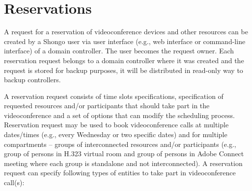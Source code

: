 \chapter{Reservations}

A request for a reservation of videoconference devices and other resources can be created by a Shongo user via user interface (e.g., web interface or command-line interface) of a domain controller. The user becomes the request owner. Each reservation request belongs to a domain controller where it was created and the request is stored for backup purposes, it will be distributed in read-only way to backup controllers.  

A reservation request consists of time slots specifications, specification of requested resources and/or participants that should take part in the videoconference and a set of options that can modify the scheduling process. Reservation request may be used to book videoconference calls at multiple dates/times (e.g., every Wednesday or two specific dates) and for multiple compartments -- groups of interconnected resources and/or participants (e.g., group of persons in H.323 virtual room and group of persons in Adobe Connect meeting where each group is standalone and not interconnected). A reservation request can specify following types of entities to take part in videoconference call(s):
